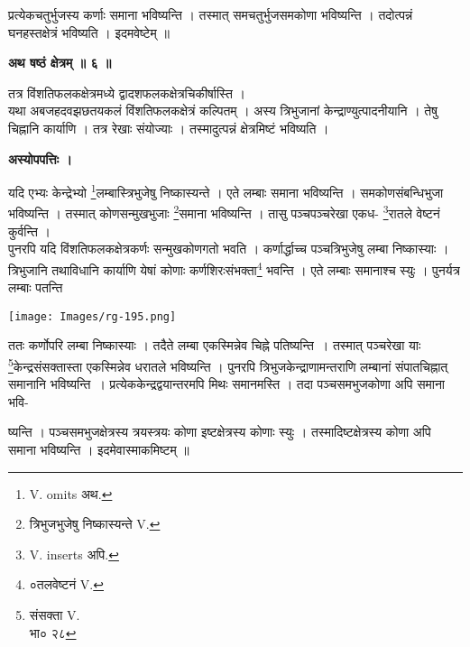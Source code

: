 \documentclass[11pt, openany]{book}
\begin{document}
\newpage
\noindent प्रत्येकचतुर्भुजस्य कर्णाः समाना भविष्यन्ति । तस्मात् समचतुर्भुजसमकोणा भविष्यन्ति । तदोत्पन्नं घनहस्तक्षेत्रं भविष्यति । इदमवेष्टेम् ॥\\

\begin{center}
\textbf{\large अथ षष्ठं क्षेत्रम् ॥ ६ ॥ }
\end{center}
\vspace{2mm}

{\ab तत्र विंशतिफलकक्षेत्रमध्ये द्वादशफलकक्षेत्रचिकीर्षास्ति । }\\

यथा अबजहदवझछतयकलं विंशतिफलकक्षेत्रं कल्पितम् । अस्य त्रिभुजानां केन्द्राण्युत्पादनीयानि । तेषु चिह्नानि कार्याणि । तत्र रेखाः संयोज्याः । तस्मादुत्पन्नं क्षेत्रमिष्टं भविष्यति ।\\

\begin{center}
\textbf{अस्योपपत्तिः ।}
\end{center}

 यदि एभ्यः केन्द्रेभ्यो \renewcommand{\thefootnote}{१}\footnote{{\en V. omits} अथ.}लम्बास्त्रिभुजेषु निष्कास्यन्ते । एते लम्बाः
समाना भविष्यन्ति । समकोणसंबन्धिभुजा
भविष्यन्ति । तस्मात् कोणसन्मुखभुजाः \renewcommand{\thefootnote}{२}\footnote{त्रिभुजभुजेषु निष्कास्यन्ते {\en V.}}समाना भविष्यन्ति । तासु पञ्चपञ्चरेखा एकध-
\renewcommand{\thefootnote}{३}\footnote{{\en V. inserts} अपि. }रातले वेष्टनं कुर्वन्ति ।\\


पुनरपि यदि विंशतिफलकक्षेत्रकर्णः सन्मुखकोणगतो भवति । कर्णार्द्धाच्च पञ्चत्रिभुजेषु
लम्बा निष्कास्याः । त्रिभुजानि तथाविधानि कार्याणि येषां कोणाः कर्णशिरःसंभक्ता\renewcommand{\thefootnote}{४}\footnote{०तलवेष्टनं {\en V.}} भवन्ति । एते लम्बाः समानाश्च स्युः । पुनर्यत्र लम्बाः पतन्ति 
\begin{center}
\noindent \texttt{[image: Images/rg-195.png]}  
\end{center}
ततः कर्णोपरि लम्बा निष्कास्याः । तदैते लम्बा
एकस्मिन्नेव चिह्ने पतिष्यन्ति~। तस्मात् पञ्चरेखा याः \renewcommand{\thefootnote}{५}\footnote{संसक्ता {\en V.}\\
भा० २८}केन्द्रसंसक्तास्ता एकस्मिन्नेव धरातले भविष्यन्ति । पुनरपि त्रिभुजकेन्द्राणामन्तराणि लम्बानां संपातचिह्नात् समानानि भविष्यन्ति~। प्रत्येककेन्द्रद्वयान्तरमपि मिथः समानमस्ति । तदा पञ्चसमभुजकोणा अपि समाना भवि-

\newpage
\noindent ष्यन्ति । पञ्चसमभुजक्षेत्रस्य त्रयस्त्रयः कोणा इष्टक्षेत्रस्य कोणाः
स्युः । तस्मादिष्टक्षेत्रस्य कोणा अपि समाना भविष्यन्ति । इदमेवास्माकमिष्टम् ॥\\
\end{document}
